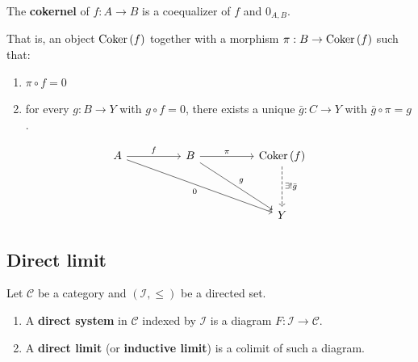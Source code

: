 \documentclass[12pt, oneside]{book}
\begin{document}
\begin{definition}
    The \textbf{cokernel} of $f:A\to B$ is a coequalizer of $f$ and $0_{A,B}$.
    \begin{remark}
        That is, an object $\operatorname{\operatorname{Coker}}\left( f \right)$ together with a morphism $\pi : B \rightarrow \operatorname{\operatorname{Coker}}\left( f \right)$ such that:
        \begin{enumerate}[label=(\roman*)]
            \item
                  $\pi \circ f=0$
            \item
                  for every $g: B \rightarrow Y$ with $g \circ f=0$, there exists a unique $\bar{g}: C \rightarrow Y$ with $\bar{g} \circ \pi=g$.
        \end{enumerate}
        \begin{equation*}
            \begin{tikzcd}
                A \arrow[rr,"f"] \arrow[rrrrdd,"0"']&&B\arrow[rr,"\pi"] \arrow[ddrr,"g"]&& \Coker\left( f \right)\arrow[dd,dashed,"\exists!\bar{g}"]\\
                &&&&\\
                &&&&Y
            \end{tikzcd}
        \end{equation*}
    \end{remark}
\end{definition}


\subsection{Direct limit}
\begin{definition}
    Let $\mathcal{C}$ be a category and $\left(\mathcal{I},\leq\right)$ be a directed set.
    \begin{enumerate}
        \item
              A \textbf{direct system} in $\mathcal{C}$ indexed by $\mathcal{I}$ is a diagram $F:\mathcal{I}\to\mathcal{C}$.
        \item
              A \textbf{direct limit} (or \textbf{inductive limit}) is a colimit of such a diagram.
    \end{enumerate}
\end{definition}
\end{document}
